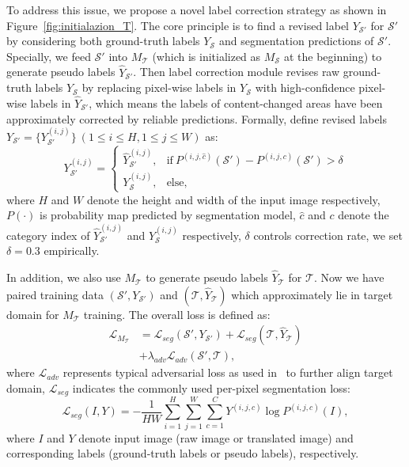 \documentclass[10pt,twocolumn,letterpaper]{article}
\begin{document}
To address this issue, we propose a novel label correction strategy as shown in Figure~\ref{fig:initialazion_T}. The core principle is to find a revised label $Y_{\mathcal{S}'}$ for ${\mathcal{S}'}$ by considering both ground-truth labels $Y_{\mathcal{S}}$ and segmentation predictions of ${\mathcal{S}'}$. Specially, we feed $\mathcal{S'}$ into $M_{\mathcal{T}}$ (which is initialized as $M_{\mathcal{S}}$ at the beginning) to generate pseudo labels $\hat{Y}_{\mathcal{S}'}$. Then label correction module revises raw ground-truth labels $Y_{\mathcal{S}}$ by replacing pixel-wise labels in $Y_{\mathcal{S}}$ with high-confidence pixel-wise labels in $\hat{Y}_{\mathcal{S}'}$, which means the labels of content-changed areas have been approximately corrected by reliable predictions. Formally, define revised labels $Y_{\mathcal{S}'} = \{ Y_\mathcal{S'}^{(i,j)}\}~(1 \leq i \leq H, 1 \leq j \leq W)$ as:
\begin{equation}
\label{equ:correction}
 Y_\mathcal{S'}^{(i,j)}=\left\{
\begin{array}{ll}
\hat{Y}^{(i,j)}_{\mathcal{S}'}, & \mbox{if} \ P^{(i,j,\hat{c})}(\mathcal{S}')  - P^{(i,j,c)}(\mathcal{S}') > \delta\\
Y^{(i,j)}_\mathcal{S},&  \mbox{else,}
\end{array}
\right.
\end{equation}
where $H$ and $W$ denote the height and width of the input image respectively, $P(\cdot)$ is probability map predicted by segmentation model, $\hat{c}$ and $c$ denote the category index of $\hat{Y}^{(i,j)}_{\mathcal{S}'}$ and $Y^{(i,j)}_{\mathcal{S}}$ respectively, $\delta$ controls correction rate, we set $\delta=0.3$ empirically.

In addition, we also use $M_{\mathcal{T}}$ to generate pseudo labels $\hat{Y}_{\mathcal{T}}$ for $\mathcal{T}$. Now we have paired training data $(\mathcal{S}', Y_{\mathcal{S}'})$ and $(\mathcal{T}, \hat{Y}_{\mathcal{T}})$ which approximately lie in target domain for $M_{\mathcal{T}}$ training. The overall loss is defined as:
\begin{equation}
 \label{loss:init_seg_t}
 \begin{aligned}
 \mathcal{L}_{M_{\mathcal{T}}} &=\mathcal{L}_{seg}(\mathcal{S}', Y_\mathcal{S'}) + \mathcal{L}_{seg}(\mathcal{T}, \hat{Y}_{\mathcal{T}})\\
 &+\lambda_{adv} \mathcal{L}_{adv}(\mathcal{S'},\mathcal{T}),
 \end{aligned}
 \end{equation}
where $\mathcal{L}_{adv}$ represents typical adversarial loss as used in~\cite{tsai2018learning,li2019bidirectional,yang2020label} to further align target domain, $\mathcal{L}_{seg}$ indicates the commonly used per-pixel segmentation loss: 
\begin{equation}
  \label{loss:seg}
\mathcal{L}_{seg}(I,Y)=-\frac{1}{HW}\sum_{i=1}^{H}\sum_{j=1}^{W}\sum_{c=1}^{C}Y^{(i,j,c)}\log P^{(i,j,c)}(I),
 \end{equation}
 where $I$ and $Y$ denote input image (raw image or translated image) and corresponding labels (ground-truth labels or pseudo labels), respectively.
 
\end{document}
